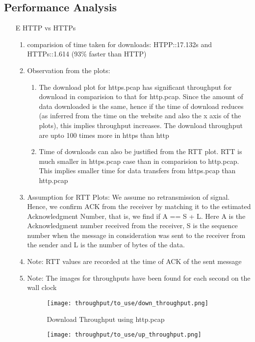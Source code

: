 \documentclass[12pt]{article}
\begin{document}
\subsection{Performance Analysis}
\begin{enumerate}
    \item[E] HTTP vs HTTPs
    \begin{enumerate}
        \item comparision of time taken for downloads: HTPP::17.132s and HTTPs::1.614 (93\% faster than HTTP)
        \item Observation from the plots: 
        \begin{enumerate}
            \item The download plot for https.pcap has significant throughput for download in comparision to that for http.pcap. Since the amount of data downloaded is the same, hence if the time of download reduces (as inferred from the time on the website and also the x axis of the plots), this implies throughput increases. The download throughput are upto 100 times more in https than http
            \item Time of downloads can also be justified from the RTT plot. RTT is much smaller in https.pcap case than in comparision to http.pcap. This implies smaller time for data transfers from https.pcap than http.pcap
        \end{enumerate}
         \item Assumption for RTT Plots: We assume no retransmission of signal. Hence, we confirm ACK from the receiver by matching it to the estimated Acknowledgment Number, that is, we find if A == S + L. Here A is the Acknowledgment number received from the receiver, S is the sequence number when the message in consideration was sent to the receiver from the sender and L is the number of bytes of the data.
         \item Note: RTT values are recorded at the time of ACK of the sent message
         \item Note: The images for throughputs have been found for each second on the wall clock
        \begin{figure}[h!]
            \centering
            \texttt{[image: throughput/to\_use/down\_throughput.png]}
            \caption{Download Throughput using http.pcap}
        \end{figure}
        \begin{figure}[h!]
            \centering
            \texttt{[image: throughput/to\_use/up\_throughput.png]}

\end{figure}
\end{enumerate}
\end{enumerate}
\end{document}
